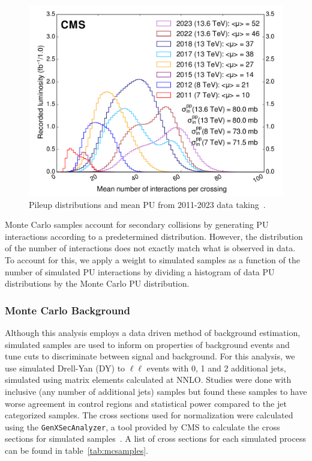 \begin{figure}[htb!]
	\centering
	\includegraphics[width=0.8\linewidth]{figs/05_analysis/pileup_allYears.pdf}
	\caption[Pileup distributions and mean PU from 2011-2023 data taking.]{Pileup distributions and mean PU from 2011-2023 data taking~\cite{CMSlumi}.}
	\label{fig:pileup}
\end{figure}

Monte Carlo samples account for secondary collisions by generating PU interactions according to a predetermined distribution. However, the distribution of the number of interactions does not exactly match what is observed in data. To account for this, we apply a weight to simulated samples as a function of the number of simulated PU interactions by dividing a histogram of data PU distributions by the Monte Carlo PU distribution.

\subsubsection{Monte Carlo Background} \label{sec:ana_mcbkg}
Although this analysis employs a data driven method of background estimation, simulated samples are used to inform on properties of background events and tune cuts to discriminate between signal and background. For this analysis, we use simulated Drell-Yan (DY) to $\ell\ell$ events with 0, 1 and 2 additional jets, simulated using matrix elements calculated at NNLO. Studies were done with inclusive (any number of additional jets) samples but found these samples to have worse agreement in control regions and statistical power compared to the jet categorized samples. The cross sections used for normalization were calculated using the \texttt{GenXSecAnalyzer}, a tool provided by CMS to calculate the cross sections for simulated samples~\cite{genxsecana}. A list of cross sections for each simulated process can be found in table~\ref{tab:mcsamples}.


